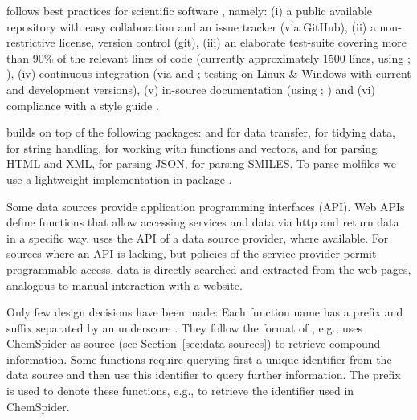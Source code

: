 \documentclass[article]{jss}
\begin{document}
 follows best practices for scientific software
\citep{wilson_best_2014, poisot_best_2015}, namely: (i) a public
available repository with easy collaboration and an issue tracker (via
GitHub), (ii) a non-restrictive license, version control (git), (iii)
an elaborate test-suite covering more than 90\% of the relevant lines
of code (currently approximately 1500 lines, using ;
\citealt{wickham_testthat:_2011}), (iv) continuous integration (via
\citet{travis-ci} and \citet{appveyor}; testing on Linux \& Windows
with current and development  versions), (v) in-source
documentation (using ; \citealt{wickham_roxygen2})
and (vi) compliance with a style guide \citep{wickham_advanced_2015}.

 builds on top of the following  packages:
 \citep{lang_rcurl:_2015} and 
\citep{wickham_httr} for data transfer,  \citep{wickham_dplyr} for tidying data, 
\citep{wickham_stringr:_2015} for string handling,  \citep{wickham_purrr} for working with functions and vectors, 
\citep{wickham_xml2} and  \citep{wickham_rvest} for parsing
HTML and XML,  \citep{ooms_jsonlite_2014} for parsing
JSON,  \citep{guha_rcdk} for parsing SMILES. To parse
molfiles we use a lightweight implementation in package 
\citep{Grabner_Varmuza_Dehmer_2012}.

Some data sources provide application programming interfaces (API).
Web APIs define functions that allow accessing services and data via
http and return data in a specific way.   uses the API of
a data source provider, where available.  For sources where an API is
lacking, but policies of the service provider permit programmable access, data is directly searched and extracted from the web pages,
analogous to manual interaction with a website. 

Only few design decisions have been made: Each function name has a
prefix and suffix separated by an underscore
\citep{Chamberlain_Szocs_2013}.  They follow the format of
, e.g.,  uses ChemSpider as
source (see Section~\ref{sec:data-sources}) to retrieve compound
information.  Some functions require querying first a unique
identifier from the data source and then use this identifier to query
further information.  The prefix  is used to denote these
functions, e.g.,  to retrieve the identifier used in
ChemSpider.
\end{document}
